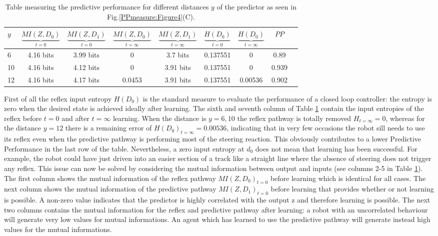 \begin{table}[htbp]
\addtolength{\tabcolsep}{-2pt}
\caption[Table with entropy values for simple robot]{Table measuring the predictive performance for different distances $y$ of the predictor as seen in Fig.\ref{PPmeasure:Figure4}(C). \label{table:PPmeausure:TableSimplePP}}
\begin{small}
\begin{center}
  \begin{tabular}{|l|c|c|c|c|c|c|c|c|}
    \hline
    $y$ & $\underbrace{MI(Z,D_0)}_{t=0}$ & $\underbrace{MI(Z,D_1)}_{t=0}$ & $\underbrace{MI(Z,D_0)}_{t=\infty}$& $\underbrace{MI(Z,D_1)}_{t=\infty}$ & $\underbrace{H(D_{0})}_{t=0}$ & $\underbrace{H(D_{0})}_{t=\infty}$ & $PP$ \\ \hline
     6 &4.16 bits&3.99 bits&0& 3.7 bits& 0.137551&0&0.89\\ \hline
     10 &4.16 bits&4.12 bits&0& 3.91 bits& 0.137551&0&0.939\\ \hline
     12 &4.16 bits&4.17 bits&0.0453& 3.91 bits& 0.137551&0.00536&0.902\\ \hline
  \end{tabular}
\end{center}
\end{small}
\end{table}

First of all the reflex input entropy $H(D_{0})$ is the standard measure
to evaluate the performance of a closed loop controller: the entropy is zero when
the desired state is achieved ideally after learning.
The sixth and seventh column of Table \ref{table:PPmeausure:TableSimplePP} contain
the input entropies of the reflex before $t=0$ and after $t=\infty$ learning.
When the distance is $y=6,10$ the reflex pathway is totally removed $H_{t=\infty}=0$,
whereas for the distance $y=12$ there is a remaining error of $H(D_{0})_{t=\infty}=0.00536$,
indicating that in very few occasions the robot sill needs to use its reflex even when
the predictive pathway is performing most of the steering reaction.
This obviously contributes to a lower Predictive Performance in the last row of the table.
Nevertheless, a zero input entropy at $d_0$ does not mean that learning has been
successful. For example, the robot could have just driven into an easier section of a track
like a straight line where the absence of steering does not trigger any reflex.
This issue can now be solved by considering the mutual information between output and inputs
(see columns 2-5 in Table \ref{table:PPmeausure:TableSimplePP}).
The first column shows the mutual information of the reflex pathway $MI(Z,D_0)_{t=0}$
before learning which is identical for all cases.
The next column shows the mutual information of the predictive pathway $MI(Z,D_1)_{t=0}$
before learning that provides whether or not learning is possible.
A non-zero value indicates that the predictor is highly correlated with the output z
and therefore learning is possible.
The next two columns contains the mutual information for the reflex and 
predictive pathway after learning: a robot with an uncorrelated behaviour will generate
very low values for mutual informations.
An agent which has learned to use the predictive pathway will generate instead
high values for the mutual informations.

